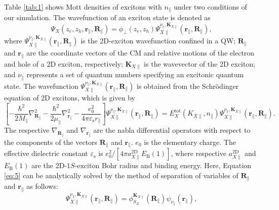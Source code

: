 %
Table \ref{tab:1} shows Mott densities of excitons with $n_{\parallel}$
under two conditions of our simulation.
%
The wavefunction of an exciton state is denoted as
\begin{equation}
    \Psi_{X}(z_e, z_h, \bm{r}_{\parallel}, \bm{R}_{\parallel})
    = \phi_{\perp}(z_e, z_h)
        \Psi_{X\parallel}^{\nu_{\parallel},\bm{K}_{X\parallel}}
        (\bm{r}_{\parallel}, \bm{R}_{\parallel} ),
\end{equation}
where
$\Psi_{X\parallel}^{\nu_{\parallel},\bm{K}_{X\parallel}}
    (\bm{r}_{\parallel}, \bm{R}_{\parallel} )$
is the 2D-exciton wavefunction confined in a QW;
$\bm{R}_\parallel$ and $\bm{r}_\parallel$ are the coordinate vectors
of the CM and relative motions of the electron and hole of a 2D exciton, respectively;
$\bm{K}_{X\parallel}$ is the wavevector of the 2D exciton;
and $\nu_{\parallel}$ represents a set of quantum numbers specifying an excitonic quantum state.
%
The wavefunction
$\Psi_{X\parallel}^{\nu_{\parallel},\bm{K}_{X\parallel}}
    (\bm{r}_{\parallel}, \bm{R}_{\parallel} )$
is obtained from the Schr\"{o}dinger equation of 2D excitons, which is given by
%
\begin{equation}
    \left[
        - \frac{\hbar^2}{2M_{\parallel}}  \nabla_{\bm{R}_{\parallel}}^2
        - \frac{\hbar^2}{2\mu_{\parallel}}\nabla_{\bm{r}_{\parallel}}^2
        - \frac{ e_0^2 }{ 4\pi\varepsilon_{\mathrm{s}} r_{\parallel} }
    \right]
    \Psi_{X\parallel}^{\nu_{\parallel},\bm{K}_{X\parallel}}
    (\bm{r}_{\parallel}, \bm{R}_{\parallel} )
    =
    E_X^{\mathrm{tot}}(K_{X\parallel}, n_{\parallel})
    \Psi_{X\parallel}^{\nu_{\parallel},\bm{K}_{X\parallel}}
    (\bm{r}_{\parallel}, \bm{R}_{\parallel} ).
\end{equation}
%
The respective $\nabla_{\bm{R}_{\parallel}}$ and $\nabla_{\bm{r}_{\parallel}}$ are
the nabla differential operators with respect to the components of the vectors
$\bm{R}_{\parallel}$ and $\bm{r}_{\parallel}$.
%
$e_0$ is the elementary charge.
%
The effective dielectric constant $\varepsilon_{\mathrm{s}}$ is
$ e_0^2 / [ 4 \pi a_{X\parallel}^{\mathrm{2D}} E_{\mathrm{B}}(1) ]$,
where respective $a_{X\parallel}^{\mathrm{2D}}$ and $E_{\mathrm{B}}(1)$
are the 2D-$1S$-exciton Bohr radius and binding energy.
%
Here, Equation \eqref{eq:5} can be analytically solved
by the method of separation of variables of $\bm{R}_{\parallel}$ and $\bm{r}_{\parallel}$ as follows:
%
\begin{equation}
    \Psi_{X\parallel}^{\nu_{\parallel},\bm{K}_{X\parallel}}
    (\bm{r}_{\parallel}, \bm{R}_{\parallel} )
        = \phi_{S_X}^{\bm{K}_{X\parallel}}(\bm{R}_{\parallel})
          \psi_{\nu_{\parallel}}(\bm{r}_{\parallel}),
\end{equation}
